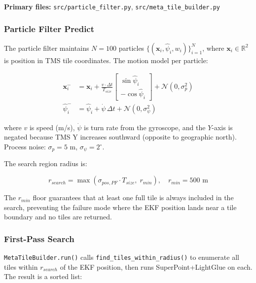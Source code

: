 \documentclass[12pt,a4paper]{article}
\newcommand{\R}{\mathbb{R}}
\newcommand{\bx}{\mathbf{x}}
\begin{document}
\noindent\textbf{Primary files:} \texttt{src/particle\_filter.py},
\texttt{src/meta\_tile\_builder.py}

\subsubsection{Particle Filter Predict}

The particle filter maintains $N = 100$ particles
$\{(\bx_i, \hat{\psi}_i, w_i)\}_{i=1}^N$, where $\bx_i \in \R^2$ is position
in TMS tile coordinates. The motion model per particle:

\begin{align}
    \bx_i^- &= \bx_i +
        \frac{v \cdot \Delta t}{T_{size}}
        \begin{bmatrix} \sin\hat{\psi}_i \\ -\cos\hat{\psi}_i \end{bmatrix}
        + \mathcal{N}(0, \sigma_p^2)
    \label{eq:pf_predict_pos} \\
    \hat{\psi}_i^- &= \hat{\psi}_i + \dot{\psi}\,\Delta t
        + \mathcal{N}(0, \sigma_\psi^2)
    \label{eq:pf_predict_hdg}
\end{align}

where $v$ is speed (m/s), $\dot{\psi}$ is turn rate from the gyroscope, and
the $Y$-axis is negated because TMS Y increases southward (opposite to
geographic north). Process noise: $\sigma_p = 5$ m, $\sigma_\psi = 2^\circ$.

The search region radius is:

\begin{equation}
    r_{search} = \max\!\left( \sigma_{pos,PF} \cdot T_{size},\; r_{min} \right), \quad
    r_{min} = 500 \text{ m}
    \label{eq:search_radius}
\end{equation}

The $r_{min}$ floor guarantees that at least one full tile is always included
in the search, preventing the failure mode where the EKF position lands near a
tile boundary and no tiles are returned.

\subsubsection{First-Pass Search}

\texttt{MetaTileBuilder.run()} calls \texttt{find\_tiles\_within\_radius()}
to enumerate all tiles within $r_{search}$ of the EKF position, then runs
SuperPoint+LightGlue on each. The result is a sorted list:
\end{document}
